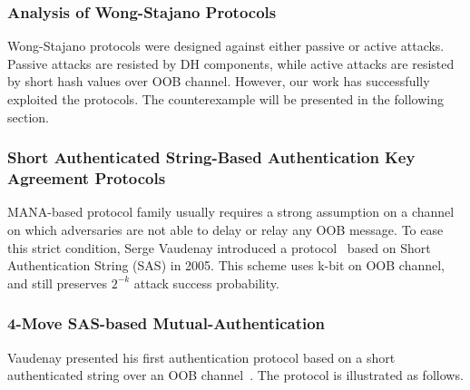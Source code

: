 \subsubsection*{Analysis of Wong-Stajano Protocols}

Wong-Stajano protocols were designed against either passive or active attacks. Passive attacks are resisted by DH components, while active attacks are resisted by short hash values over OOB channel. However, our work has successfully exploited the protocols. The counterexample will be presented in the following section. 

\subsubsection{Short Authenticated String-Based Authentication Key Agreement Protocols}

MANA-based protocol family usually requires a strong assumption on a channel on which adversaries are not able to delay or relay any OOB message. To ease this strict condition, Serge Vaudenay introduced a protocol~\cite{Vaudenay:2005qa} based on Short Authentication String (SAS) in 2005. This scheme uses k-bit on OOB channel, and still preserves $2^{-k}$ attack success probability.

\subsubsection*{4-Move SAS-based Mutual-Authentication}

Vaudenay presented his first authentication protocol based on a short authenticated string over an OOB channel~\cite{Vaudenay:2005qa}. The protocol is illustrated as follows.


